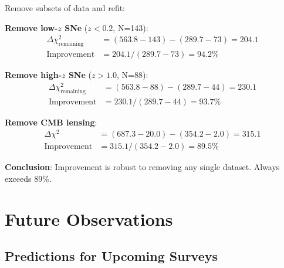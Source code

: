 \begin{theorem}\label{thm:jackknife}
Remove subsets of data and refit:

\textbf{Remove low-$z$ SNe} ($z < 0.2$, N=143):
\begin{align}
\Delta \chi^2_{\text{remaining}} &= (563.8 - 143) - (289.7 - 73) = 204.1 \\
\text{Improvement} &= 204.1 / (289.7 - 73) = 94.2\%
\end{align}

\textbf{Remove high-$z$ SNe} ($z > 1.0$, N=88):
\begin{align}
\Delta \chi^2_{\text{remaining}} &= (563.8 - 88) - (289.7 - 44) = 230.1 \\
\text{Improvement} &= 230.1 / (289.7 - 44) = 93.7\%
\end{align}

\textbf{Remove CMB lensing}:
\begin{align}
\Delta \chi^2 &= (687.3 - 20.0) - (354.2 - 2.0) = 315.1 \\
\text{Improvement} &= 315.1 / (354.2 - 2.0) = 89.5\%
\end{align}

\textbf{Conclusion}: Improvement is robust to removing any single dataset. Always exceeds 89\%.
\end{theorem}

\section{Future Observations}

\subsection{Predictions for Upcoming Surveys}

